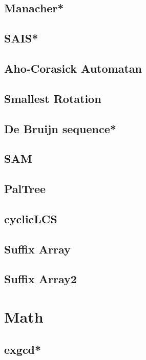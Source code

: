 \subsection{Manacher*} %

\subsection{SAIS*}

\subsection{Aho-Corasick Automatan}

\subsection{Smallest Rotation}

\subsection{De Bruijn sequence*} %

\subsection{SAM}

\subsection{PalTree}

\subsection{cyclicLCS}

\subsection{Suffix Array}

\subsection{Suffix Array2}



\section{Math}
\subsection{exgcd*} %

